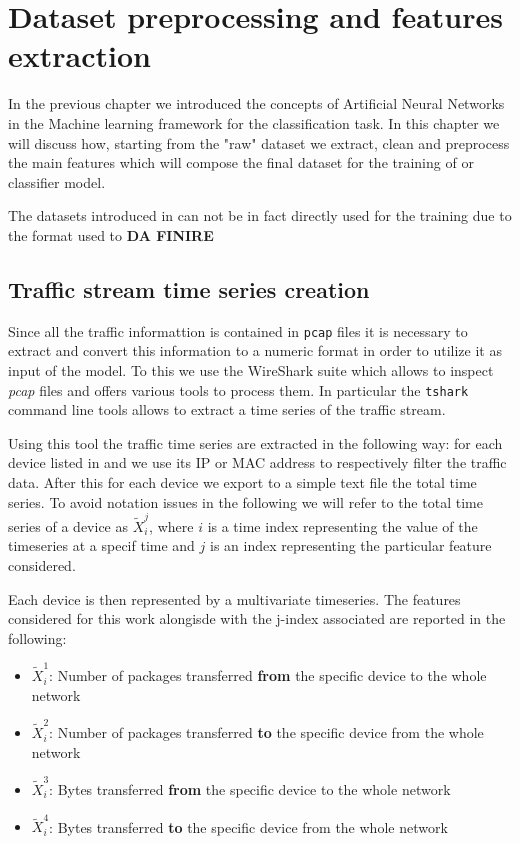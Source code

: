 \chapter{Dataset preprocessing and features extraction}\label{chap4}

In the previous chapter we introduced the concepts of Artificial Neural Networks in the Machine learning framework for the classification task. In this chapter we will discuss how, starting from the "raw" dataset we extract, clean and preprocess the main features which will compose the final dataset for the training of or classifier model.

The datasets introduced in  can not be in fact directly used for the training due to the format used to \textbf{\large{DA FINIRE}}

\section{Traffic stream time series creation}

Since all the traffic informattion is contained in \texttt{pcap} files it is necessary to extract and convert this information to a numeric format in order to utilize it as input of the model.
To this we use the WireShark suite which allows to inspect \textit{pcap} files and offers various tools to process them. In particular the \texttt{tshark} command line tools allows to extract a time series of the traffic stream.

Using this tool the traffic time series are extracted in the following way: for each device listed in  and  we use its IP or MAC address to respectively filter the traffic data. After this for each device we export to a simple text file the total time series. To avoid notation issues in the following we will refer to the total time series of a device as ${\tilde{X}_i^j}$, where $i$ is a time index representing the value of the timeseries at a specif time and $j$ is an index representing the particular feature considered. 

Each device is then represented by a multivariate timeseries. The features considered for this work alongisde with the j-index associated are reported in the following:
\begin{itemize}
    \item ${\tilde{X}_i^1}$: Number of packages transferred \textbf{from} the specific device to the whole network
    \item ${\tilde{X}_i^2}$: Number of packages transferred \textbf{to} the specific device from the whole network
    \item ${\tilde{X}_i^3}$: Bytes transferred \textbf{from} the specific device to the whole network
    \item ${\tilde{X}_i^4}$: Bytes transferred \textbf{to} the specific device from the whole network
\end{itemize}

